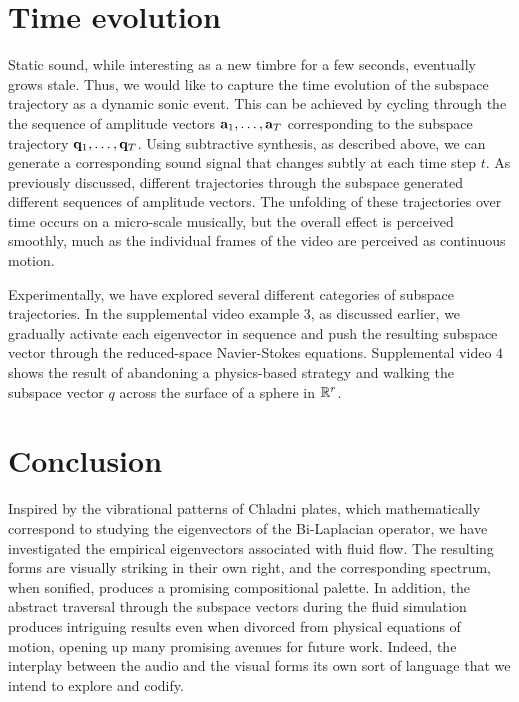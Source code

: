 \documentclass[11pt]{article}
\begin{document}
\section*{Time evolution}
Static sound, while interesting as a new timbre for a few seconds, eventually grows stale. Thus, we would like to capture the time evolution of the subspace trajectory as a dynamic sonic event. This can be achieved by cycling through the the sequence of amplitude vectors $\mathbf{a}_1, \ldots, \mathbf{a}_T$ corresponding to the subspace trajectory $\mathbf{q}_1, \ldots, \mathbf{q}_T$. Using subtractive synthesis, as described above, we can generate a corresponding sound signal that changes subtly at each time step $t$. As previously discussed, different trajectories through the subspace generated different sequences of amplitude vectors. The unfolding of these trajectories over time occurs on a micro-scale musically, but the overall effect is perceived smoothly, much as the individual frames of the video are perceived as continuous motion.

Experimentally, we have explored several different categories of subspace trajectories. In the supplemental video example $3$, as discussed earlier, we gradually activate each eigenvector in sequence and push the resulting subspace vector through the reduced-space Navier-Stokes equations. Supplemental video $4$ shows the result of abandoning a physics-based strategy and walking the subspace vector $q$ across the surface of a sphere in $\mathbb{R}^r$. 

\section*{Conclusion}
Inspired by the vibrational patterns of Chladni plates, which mathematically correspond to studying the eigenvectors of the Bi-Laplacian operator, we have investigated the empirical eigenvectors associated with fluid flow. The resulting forms are visually striking in their own right, and the corresponding spectrum, when sonified, produces a promising compositional palette. In addition, the abstract traversal through the subspace vectors during the fluid simulation produces intriguing results even when divorced from physical equations of motion, opening up many promising avenues for future work. Indeed, the interplay between the audio and the visual forms its own sort of language that we intend to explore and codify.







\fontsize{10}{12}

\end{document}
